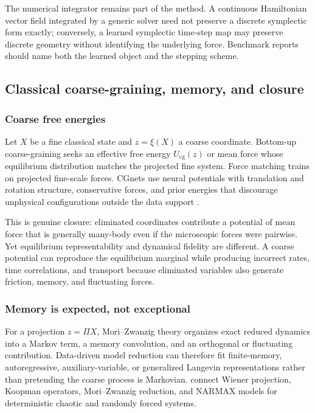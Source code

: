 The numerical integrator remains part of the method. A continuous Hamiltonian vector field integrated by a generic solver need not preserve a discrete symplectic form exactly; conversely, a learned symplectic time-step map may preserve discrete geometry without identifying the underlying force. Benchmark reports should name both the learned object and the stepping scheme.

\subsection{Classical coarse-graining, memory, and closure}

\subsubsection{Coarse free energies}

Let \(X\) be a fine classical state and \(z=\xi(X)\) a coarse coordinate. Bottom-up coarse-graining seeks an effective free energy \(U_{\mathrm{cg}}(z)\) or mean force whose equilibrium distribution matches the projected fine system. Force matching trains on projected fine-scale forces. CGnets use neural potentials with translation and rotation structure, conservative forces, and prior energies that discourage unphysical configurations outside the data support \citep{wang2019cgnet}.

This is genuine closure: eliminated coordinates contribute a potential of mean force that is generally many-body even if the microscopic forces were pairwise. Yet equilibrium representability and dynamical fidelity are different. A coarse potential can reproduce the equilibrium marginal while producing incorrect rates, time correlations, and transport because eliminated variables also generate friction, memory, and fluctuating forces.

\subsubsection{Memory is expected, not exceptional}

For a projection \(z=\Pi X\), Mori--Zwanzig theory organizes exact reduced dynamics into a Markov term, a memory convolution, and an orthogonal or fluctuating contribution. Data-driven model reduction can therefore fit finite-memory, autoregressive, auxiliary-variable, or generalized Langevin representations rather than pretending the coarse process is Markovian. \citet{lin2021kmz} connect Wiener projection, Koopman operators, Mori--Zwanzig reduction, and NARMAX models for deterministic chaotic and randomly forced systems.

